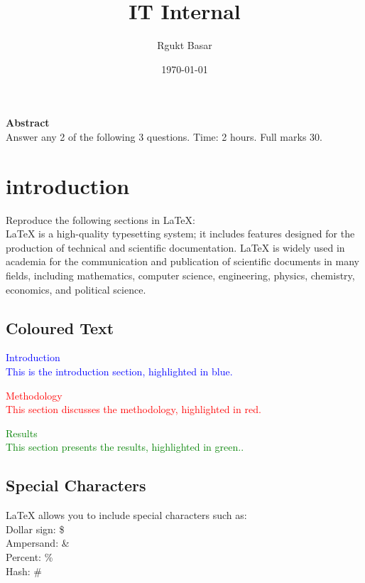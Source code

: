 \documentclass{article}
\title{IT Internal }
\author{Rgukt Basar}
\date{\today}
\begin{document}
	\maketitle
	\center \textbf{Abstract}\\
	
	Answer any 2 of the following 3 questions. Time: 2 hours. Full marks 30.

	\section{introduction}
     Reproduce the following sections in LaTeX:\\
     LaTeX is a high-quality typesetting system; it includes features designed for the production of technical
     and scientific documentation. LaTeX is widely used in academia for the communication and publication
     of scientific documents in many fields, including mathematics, computer science, engineering, physics,
     chemistry, economics, and political science.
	
	\subsection{Coloured Text}

     \large \textcolor{blue}{Introduction}\\
     
     \textcolor{blue}{This is the introduction section, highlighted in blue.}
     
     
     \large \textcolor{red}{Methodology}\\
     
     \textcolor{red}{This section discusses the methodology, highlighted in red.}
     

      \huge \textcolor{green}{Results}\\
     
     \small\textcolor{green}{This section presents the results, highlighted in green..}
     
     

	
	\subsection{Special Characters}
	 LaTeX allows you to include special characters such as:\\
	 Dollar sign: \$\\
	 Ampersand: \& \\
	 Percent: \% \\
	 Hash: \#
	 
\end{document}
